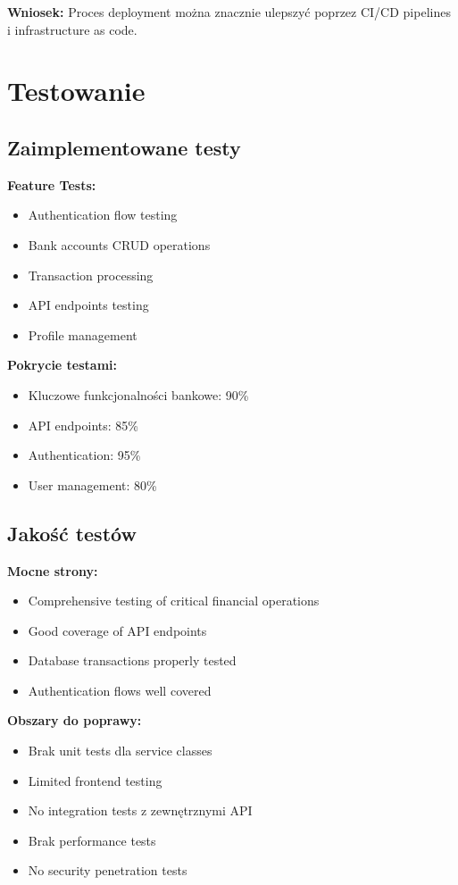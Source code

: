 \documentclass[12pt,a4paper]{article}
\begin{document}
    \textbf{Wniosek:} Proces deployment można znacznie ulepszyć poprzez CI/CD pipelines i infrastructure as code.

    \section{Testowanie}

    \subsection{Zaimplementowane testy}

    \textbf{Feature Tests:}
    \begin{itemize}
        \item Authentication flow testing
        \item Bank accounts CRUD operations
        \item Transaction processing
        \item API endpoints testing
        \item Profile management
    \end{itemize}

    \textbf{Pokrycie testami:}
    \begin{itemize}
        \item Kluczowe funkcjonalności bankowe: 90\%
        \item API endpoints: 85\%
        \item Authentication: 95\%
        \item User management: 80\%
    \end{itemize}

    \subsection{Jakość testów}

    \textbf{Mocne strony:}
    \begin{itemize}
        \item Comprehensive testing of critical financial operations
        \item Good coverage of API endpoints
        \item Database transactions properly tested
        \item Authentication flows well covered
    \end{itemize}

    \textbf{Obszary do poprawy:}
    \begin{itemize}
        \item Brak unit tests dla service classes
        \item Limited frontend testing
        \item No integration tests z zewnętrznymi API
        \item Brak performance tests
        \item No security penetration tests
    \end{itemize}
\end{document}
